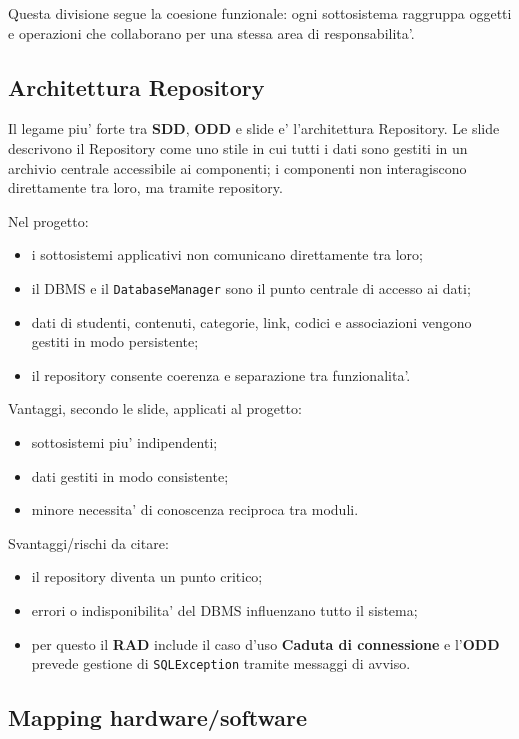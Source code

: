 ﻿\documentclass[11pt,a4paper]{article}
\newcommand{\doc}[1]{\textbf{#1}}
\newcommand{\term}[1]{\textbf{#1}}
\begin{document}
Questa divisione segue la coesione funzionale: ogni sottosistema raggruppa oggetti e
operazioni che collaborano per una stessa area di responsabilita'.

\subsection{Architettura Repository}

Il legame piu' forte tra \doc{SDD}, \doc{ODD} e slide e' l'architettura Repository. Le slide
descrivono il Repository come uno stile in cui tutti i dati sono gestiti in un archivio
centrale accessibile ai componenti; i componenti non interagiscono direttamente tra loro,
ma tramite repository.

Nel progetto:
\begin{itemize}
  \item i sottosistemi applicativi non comunicano direttamente tra loro;
  \item il DBMS e il \texttt{DatabaseManager} sono il punto centrale di accesso ai dati;
  \item dati di studenti, contenuti, categorie, link, codici e associazioni vengono gestiti
  in modo persistente;
  \item il repository consente coerenza e separazione tra funzionalita'.
\end{itemize}

Vantaggi, secondo le slide, applicati al progetto:
\begin{itemize}
  \item sottosistemi piu' indipendenti;
  \item dati gestiti in modo consistente;
  \item minore necessita' di conoscenza reciproca tra moduli.
\end{itemize}

Svantaggi/rischi da citare:
\begin{itemize}
  \item il repository diventa un punto critico;
  \item errori o indisponibilita' del DBMS influenzano tutto il sistema;
  \item per questo il \doc{RAD} include il caso d'uso \term{Caduta di connessione} e
  l'\doc{ODD} prevede gestione di \texttt{SQLException} tramite messaggi di avviso.
\end{itemize}

\subsection{Mapping hardware/software}
\end{document}
